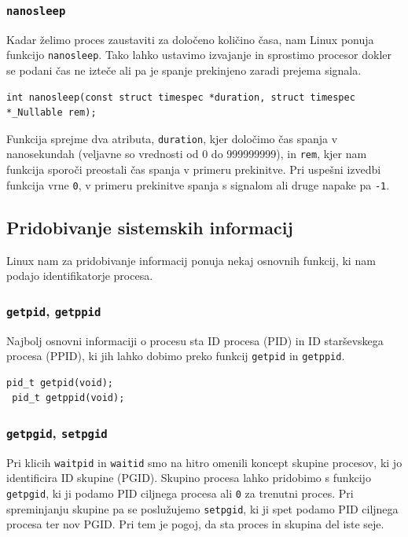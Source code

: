 \documentclass[a4paper,12pt,openright]{book}
\begin{document}
\subsubsection{\texttt{nanosleep}}

Kadar želimo proces zaustaviti za določeno količino časa, nam Linux ponuja funkcijo \texttt{nanosleep}.
Tako lahko ustavimo izvajanje in sprostimo procesor dokler se podani čas ne izteče ali pa je spanje prekinjeno zaradi prejema signala.

\begin{lstlisting}[style=func]
 int nanosleep(const struct timespec *duration, struct timespec *_Nullable rem);
\end{lstlisting}

Funkcija sprejme dva atributa, \texttt{duration}, kjer določimo čas spanja v nanosekundah (veljavne so vrednosti od 0 do 999999999), in \texttt{rem}, kjer nam funkcija sporoči preostali čas spanja v primeru prekinitve.
Pri uspešni izvedbi funkcija vrne \texttt{0}, v primeru prekinitve spanja s signalom ali druge napake pa \texttt{-1}.

\subsection{Pridobivanje sistemskih informacij}

Linux nam za pridobivanje informacij ponuja nekaj osnovnih funkcij, ki nam podajo identifikatorje procesa.

\subsubsection{\texttt{getpid}, \texttt{getppid}}

Najbolj osnovni informaciji o procesu sta ID procesa (PID) in ID starševskega procesa (PPID), ki jih lahko dobimo preko funkcij \texttt{getpid} in \texttt{getppid}.

\begin{lstlisting}[style=func]
 pid_t getpid(void);
 pid_t getppid(void);
\end{lstlisting}

\subsubsection{\texttt{getpgid}, \texttt{setpgid}}

Pri klicih \texttt{waitpid} in \texttt{waitid} smo na hitro omenili koncept skupine procesov, ki jo identificira ID skupine (PGID).
Skupino procesa lahko pridobimo s funkcijo \texttt{getpgid}, ki ji podamo PID ciljnega procesa ali \texttt{0} za trenutni proces.
Pri spreminjanju skupine pa se poslužujemo \texttt{setpgid}, ki ji spet podamo PID ciljnega procesa ter nov PGID.
Pri tem je pogoj, da sta proces in skupina del iste seje.
\end{document}

